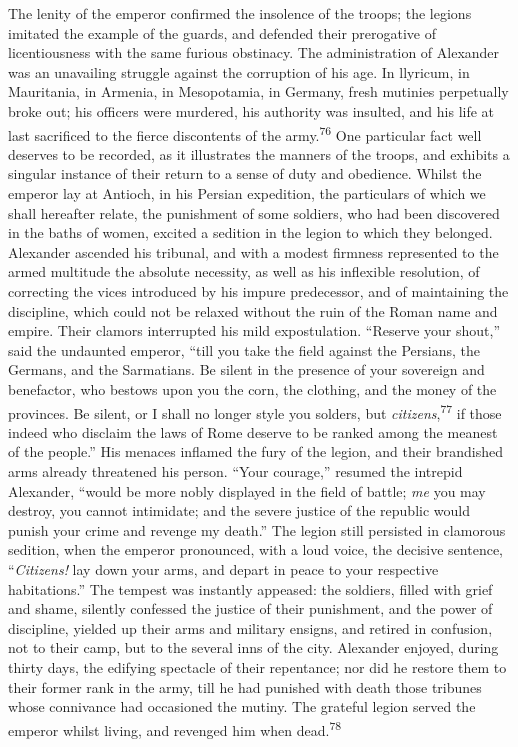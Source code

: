 The lenity of the emperor confirmed the insolence of the troops;
the legions imitated the example of the guards, and defended
their prerogative of licentiousness with the same furious
obstinacy. The administration of Alexander was an unavailing
struggle against the corruption of his age. In llyricum, in
Mauritania, in Armenia, in Mesopotamia, in Germany, fresh
mutinies perpetually broke out; his officers were murdered, his
authority was insulted, and his life at last sacrificed to the
fierce discontents of the army.\textsuperscript{76} One particular fact well
deserves to be recorded, as it illustrates the manners of the
troops, and exhibits a singular instance of their return to a
sense of duty and obedience. Whilst the emperor lay at Antioch,
in his Persian expedition, the particulars of which we shall
hereafter relate, the punishment of some soldiers, who had been
discovered in the baths of women, excited a sedition in the
legion to which they belonged. Alexander ascended his tribunal,
and with a modest firmness represented to the armed multitude the
absolute necessity, as well as his inflexible resolution, of
correcting the vices introduced by his impure predecessor, and of
maintaining the discipline, which could not be relaxed without
the ruin of the Roman name and empire. Their clamors interrupted
his mild expostulation. “Reserve your shout,” said the undaunted
emperor, “till you take the field against the Persians, the
Germans, and the Sarmatians. Be silent in the presence of your
sovereign and benefactor, who bestows upon you the corn, the
clothing, and the money of the provinces. Be silent, or I shall
no longer style you solders, but \textit{citizens},\textsuperscript{77} if those indeed
who disclaim the laws of Rome deserve to be ranked among the
meanest of the people.” His menaces inflamed the fury of the
legion, and their brandished arms already threatened his person.
“Your courage,” resumed the intrepid Alexander, “would be more
nobly displayed in the field of battle; \textit{me} you may destroy, you
cannot intimidate; and the severe justice of the republic would
punish your crime and revenge my death.” The legion still
persisted in clamorous sedition, when the emperor pronounced,
with a loud voice, the decisive sentence, “\textit{Citizens!} lay down
your arms, and depart in peace to your respective habitations.”
The tempest was instantly appeased: the soldiers, filled with
grief and shame, silently confessed the justice of their
punishment, and the power of discipline, yielded up their arms
and military ensigns, and retired in confusion, not to their
camp, but to the several inns of the city. Alexander enjoyed,
during thirty days, the edifying spectacle of their repentance;
nor did he restore them to their former rank in the army, till he
had punished with death those tribunes whose connivance had
occasioned the mutiny. The grateful legion served the emperor
whilst living, and revenged him when dead.\textsuperscript{78}

